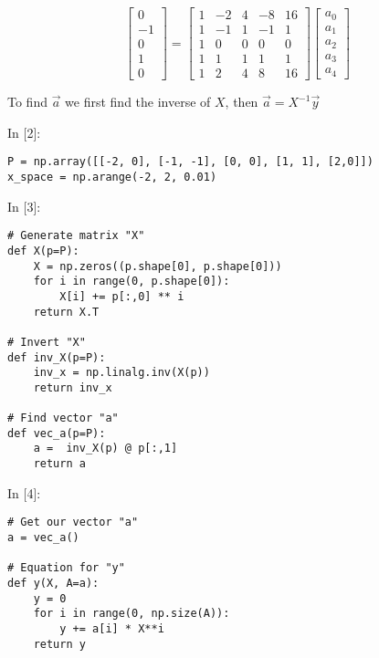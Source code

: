 \documentclass[11pt]{article}
\newif\ifcode
\newif\ifleftmargins
\newlength{\promptlength}
\newcommand{\prompt}[3]{
        \needspace{1.1cm}
        \settowidth{\promptlength}{ #1 [#3] }
        \ifleftmargins\hspace{-\promptlength}\hspace{-5pt}\fi
        {\color{#2}#1 [#3]:}
        \ifleftmargins\vspace{-2.7ex}\fi
    }
\begin{document}
\[\begin{bmatrix}
    0\\
    -1\\
    0\\
    1\\
    0
\end{bmatrix}
=
\begin{bmatrix}
    1 & -2 & 4 & -8  & 16 \\
    1 & -1 & 1 & -1 & 1 \\
    1 & 0 & 0 & 0 & 0 \\
    1 & 1 & 1 & 1 & 1 \\
    1 & 2 & 4 & 8  & 16 
\end{bmatrix}
\begin{bmatrix}
    a_0 \\
    a_1 \\
    a_2 \\
    a_3 \\
    a_4
\end{bmatrix}\]

    To find \(\vec{a}\) we first find the inverse of \(X\), then
\(\vec{a} = X^{-1} \vec{y}\)

    
\prompt{In}{incolor}{2}
\codetrue
\begin{tcolorbox}[breakable, size=fbox, boxrule=1pt, pad at break*=1mm, colback=cellbackground, colframe=cellborder]
\begin{verbatim}
P = np.array([[-2, 0], [-1, -1], [0, 0], [1, 1], [2,0]])
x_space = np.arange(-2, 2, 0.01)
\end{verbatim}
\end{tcolorbox}
\codefalse

    
\prompt{In}{incolor}{3}
\codetrue
\begin{tcolorbox}[breakable, size=fbox, boxrule=1pt, pad at break*=1mm, colback=cellbackground, colframe=cellborder]
\begin{verbatim}
# Generate matrix "X"
def X(p=P):
    X = np.zeros((p.shape[0], p.shape[0]))
    for i in range(0, p.shape[0]):
        X[i] += p[:,0] ** i
    return X.T

# Invert "X"
def inv_X(p=P):
    inv_x = np.linalg.inv(X(p))
    return inv_x

# Find vector "a"
def vec_a(p=P):
    a =  inv_X(p) @ p[:,1]
    return a
\end{verbatim}
\end{tcolorbox}
\codefalse

    
\prompt{In}{incolor}{4}
\codetrue
\begin{tcolorbox}[breakable, size=fbox, boxrule=1pt, pad at break*=1mm, colback=cellbackground, colframe=cellborder]
\begin{verbatim}
# Get our vector "a"
a = vec_a()

# Equation for "y"
def y(X, A=a):
    y = 0
    for i in range(0, np.size(A)):
        y += a[i] * X**i
    return y
\end{verbatim}
\end{tcolorbox}
\codefalse
\end{document}
